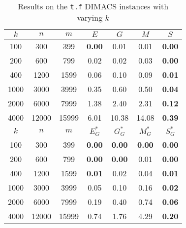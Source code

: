 \begin{table}
\centering
\begin{tabular}{
ccc|cccc}
$k$ & $n$ & $m$ & $E$ & $G$ & $M$ & $S$ \\
\hline
100 & 300 & 399 & \textbf{0.00} & 0.01 & 0.01 & \textbf{0.00} \\
200 & 600 & 799 & 0.02 & 0.02 & 0.03 & \textbf{0.00} \\
400 & 1200 & 1599 & 0.06 & 0.10 & 0.09 & \textbf{0.01} \\
1000 & 3000 & 3999 & 0.35 & 0.60 & 0.50 & \textbf{0.04} \\
2000 & 6000 & 7999 & 1.38 & 2.40 & 2.31 & \textbf{0.12} \\
4000 & 12000 & 15999 & 6.01 & 10.38 & 14.08 & \textbf{0.39} \\
\hline
$k$ & $n$ & $m$ & $E^*_G$ & $G^*_G$ & $M^*_G$ & $S^*_G$ \\
\hline
100 & 300 & 399 & \textbf{0.00} & \textbf{0.00} & \textbf{0.00} & \textbf{0.00} \\
200 & 600 & 799 & \textbf{0.00} & \textbf{0.00} & 0.01 & \textbf{0.00} \\
400 & 1200 & 1599 & \textbf{0.01} & 0.02 & 0.04 & \textbf{0.01} \\
1000 & 3000 & 3999 & 0.05 & 0.10 & 0.16 & \textbf{0.02} \\
2000 & 6000 & 7999 & 0.19 & 0.40 & 0.74 & \textbf{0.06} \\
4000 & 12000 & 15999 & 0.74 & 1.76 & 4.29 & \textbf{0.20} \\
\end{tabular}
\caption{Results on the \texttt{t.f} DIMACS instances with varying $k$}\label{tab:t}
\end{table}

